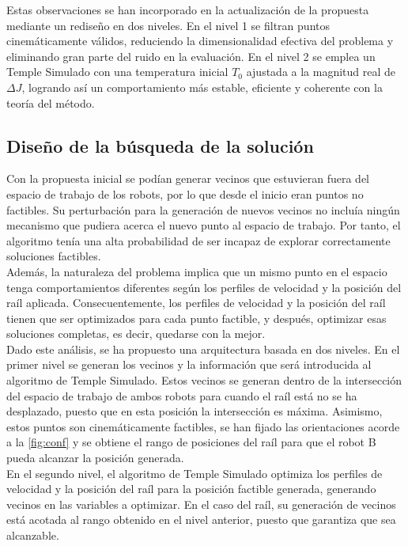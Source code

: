 Estas observaciones se han incorporado en la actualización de la propuesta
mediante un rediseño en dos niveles. En el nivel 1 se filtran puntos
cinemáticamente válidos, reduciendo la dimensionalidad
efectiva del problema y eliminando gran parte del ruido en la evaluación. En el
nivel 2 se emplea un Temple Simulado con
una temperatura inicial \(T_0\) ajustada a la magnitud real de \(\Delta J\),
logrando así un comportamiento más estable, eficiente y coherente con la teoría
del método.

\subsection*{Diseño de la búsqueda de la solución}
Con la propuesta inicial se podían generar vecinos que estuvieran fuera del espacio de trabajo 
de los robots, por lo que desde el inicio eran puntos no factibles. Su perturbación para la generación 
de nuevos vecinos no incluía ningún mecanismo que pudiera acerca el nuevo punto al espacio de trabajo. 
Por tanto, el algoritmo tenía una alta probabilidad de ser incapaz de explorar correctamente soluciones 
factibles. \\

Además, la naturaleza del problema implica que un mismo punto en el espacio tenga comportamientos diferentes 
según los perfiles de velocidad y la posición del raíl aplicada. Consecuentemente, los perfiles de
velocidad y la posición del raíl tienen que ser optimizados para cada punto factible, y después, optimizar 
esas soluciones completas, es decir, quedarse con la mejor. \\

Dado este análisis, se ha propuesto una arquitectura basada en dos niveles. En el primer nivel se generan 
los vecinos y la información que será introducida al algoritmo de Temple Simulado. Estos vecinos se generan
dentro de la intersección del espacio de trabajo de ambos robots para cuando el raíl está no se ha desplazado,
puesto que en esta posición la intersección es máxima. Asimismo, estos puntos son cinemáticamente factibles,
se han fijado las orientaciones acorde a la \autoref{fig:conf} y se obtiene el rango de posiciones del raíl
para que el robot B pueda alcanzar la posición generada. \\

En el segundo nivel, el algoritmo de Temple Simulado optimiza los perfiles de velocidad y la posición del raíl
para la posición factible generada, generando vecinos en las variables a optimizar. En el caso del raíl,
su generación de vecinos está acotada al rango obtenido en el nivel anterior, puesto que garantiza que sea alcanzable.\\

